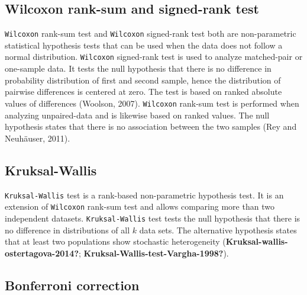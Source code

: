 \documentclass[
  parskip,
  oneside]{scrreprt}
\begin{document}
\hypertarget{wilcoxon-rank-sum-and-signed-rank-test}{%
\subsection{Wilcoxon rank-sum and signed-rank
test}\label{wilcoxon-rank-sum-and-signed-rank-test}}

\texttt{Wilcoxon} rank-sum test and \texttt{Wilcoxon} signed-rank test
both are non-parametric statistical hypothesis tests that can be used
when the data does not follow a normal distribution. \texttt{Wilcoxon}
signed-rank test is used to analyze matched-pair or one-sample data. It
tests the null hypothesis that there is no difference in probability
distribution of first and second sample, hence the distribution of
pairwise differences is centered at zero. The test is based on ranked
absolute values of differences (Woolson, 2007). \texttt{Wilcoxon}
rank-sum test is performed when analyzing unpaired-data and is likewise
based on ranked values. The null hypothesis states that there is no
association between the two samples (Rey and Neuhäuser, 2011).

\hypertarget{kruksal-wallis}{%
\subsection{Kruksal-Wallis}\label{kruksal-wallis}}

\texttt{Kruksal-Wallis} test is a rank-based non-parametric hypothesis
test. It is an extension of \texttt{Wilcoxon} rank-sum test and allows
comparing more than two independent datasets. \texttt{Kruksal-Wallis}
test tests the null hypothesis that there is no difference in
distributions of all \(k\) data sets. The alternative hypothesis states
that at least two populations show stochastic heterogeneity
(\textbf{Kruksal-wallis-ostertagova-2014?};
\textbf{Kruksal-Wallis-test-Vargha-1998?}).

\hypertarget{bonferroni-correction}{%
\subsection{Bonferroni correction}\label{bonferroni-correction}}
\end{document}
